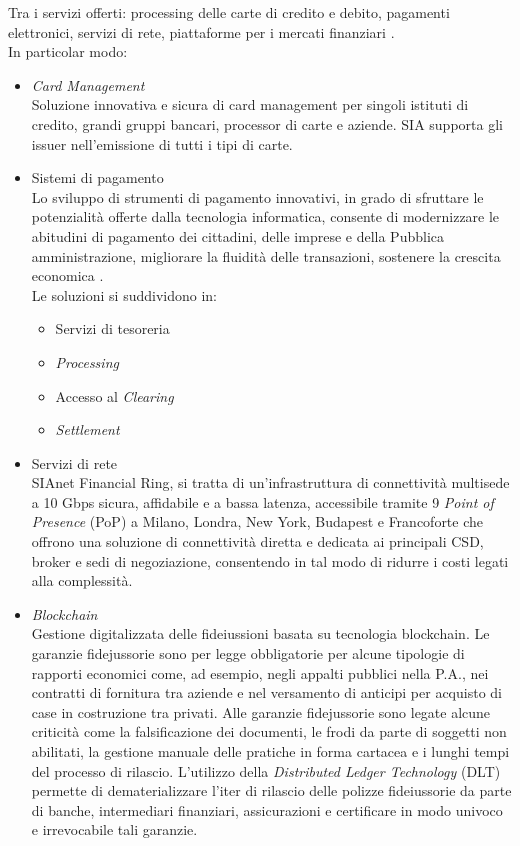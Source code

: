 Tra i servizi offerti: processing delle carte di credito e debito, pagamenti elettronici, servizi di rete, piattaforme per i mercati finanziari \cite{siasoluzioni}. \\

In particolar modo: 

\begin{itemize}
    \item \textit{Card Management} \\
    Soluzione innovativa e sicura di card management per singoli istituti di credito, grandi gruppi bancari, processor di carte e aziende. SIA supporta gli issuer nell’emissione di tutti i tipi di carte.
    
    \item Sistemi di pagamento\\
    Lo sviluppo di strumenti di pagamento innovativi, in grado di sfruttare le potenzialità offerte dalla tecnologia informatica, consente di modernizzare le abitudini di pagamento dei cittadini, delle imprese e della Pubblica amministrazione, migliorare la fluidità delle transazioni, sostenere la crescita economica \cite{bancaitalia} .
    \\Le soluzioni si suddividono in:
    \begin{itemize}
        \item Servizi di tesoreria 
        \item \textit{Processing}
        \item Accesso al \textit{Clearing}
        \item \textit{Settlement}
    \end{itemize}
    
    \item Servizi di rete \\
    SIAnet Financial Ring, si tratta di un'infrastruttura di connettività multisede a 10 Gbps sicura, affidabile e a bassa latenza, accessibile tramite 9  \textit{Point of Presence} (PoP) a Milano, Londra, New York, Budapest e Francoforte che offrono una soluzione di connettività diretta e dedicata ai principali CSD, broker e sedi di negoziazione, consentendo in tal modo di ridurre i costi legati alla complessità.
    
    
    \item \textit{Blockchain} \\
    Gestione digitalizzata delle fideiussioni basata su tecnologia blockchain. Le garanzie fidejussorie sono per legge obbligatorie per alcune  tipologie di rapporti economici come, ad esempio, negli appalti pubblici nella P.A., nei contratti di fornitura tra aziende e nel versamento di anticipi per acquisto di case in costruzione tra privati. Alle garanzie fidejussorie sono legate alcune criticità come la falsificazione dei documenti, le frodi da parte di soggetti non abilitati, la gestione manuale delle pratiche in forma cartacea e i lunghi tempi del processo di rilascio. L'utilizzo della \textit{Distributed Ledger Technology} (DLT) permette di dematerializzare l’iter di rilascio delle polizze fideiussorie da parte di banche, intermediari finanziari, assicurazioni e certificare in modo univoco e irrevocabile tali garanzie.
    

\end{itemize}
